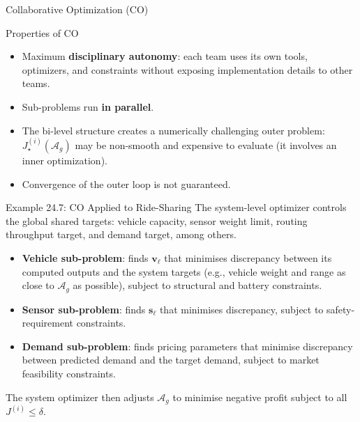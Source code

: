 \documentclass[aspectratio=169,10pt]{beamer}
\begin{document}
\begin{frame}[allowframebreaks]{Collaborative Optimization (CO)}
  \begin{block}{Properties of CO}
    \begin{itemize}
      \item[\checkmark] Maximum \textbf{disciplinary autonomy}: each team
            uses its own tools, optimizers, and constraints without
            exposing implementation details to other teams.
      \item[\checkmark] Sub-problems run \textbf{in parallel}.
      \item[$\times$] The bi-level structure creates a numerically
            challenging outer problem: $J^{(i)}_\star(\mathcal{A}_g)$ may
            be non-smooth and expensive to evaluate (it involves an inner
            optimization).
      \item[$\times$] Convergence of the outer loop is not guaranteed.
    \end{itemize}
  \end{block}

  \framebreak

  \begin{exampleblock}{Example 24.7: CO Applied to Ride-Sharing}
    The system-level optimizer controls the global shared targets:
    vehicle capacity, sensor weight limit, routing throughput target,
    and demand target, among others.
    \begin{itemize}
      \item \textbf{Vehicle sub-problem}: finds $\mathbf{v}_\ell$ that
            minimises discrepancy between its computed outputs and the
            system targets (e.g., vehicle weight and range as close to
            $\mathcal{A}_g$ as possible), subject to structural and
            battery constraints.
      \item \textbf{Sensor sub-problem}: finds $\mathbf{s}_\ell$ that
            minimises discrepancy, subject to safety-requirement constraints.
      \item \textbf{Demand sub-problem}: finds pricing parameters that
            minimise discrepancy between predicted demand and the target
            demand, subject to market feasibility constraints.
    \end{itemize}
    The system optimizer then adjusts $\mathcal{A}_g$ to minimise negative
    profit subject to all $J^{(i)} \leq \delta$.
  \end{exampleblock}

\end{frame}
\end{document}
